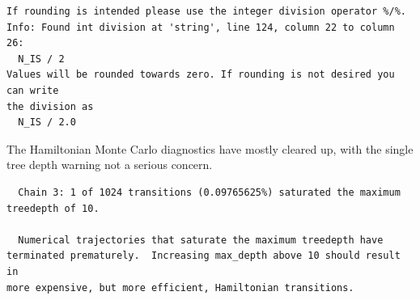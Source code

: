 \documentclass[
  letterpaper,
  DIV=11,
  numbers=noendperiod]{scrartcl}
\newenvironment{Shaded}{\begin{snugshade}}{\end{snugshade}}
\newcommand{\AttributeTok}[1]{\textcolor[rgb]{0.40,0.45,0.13}{#1}}
\newcommand{\DecValTok}[1]{\textcolor[rgb]{0.68,0.00,0.00}{#1}}
\newcommand{\FunctionTok}[1]{\textcolor[rgb]{0.28,0.35,0.67}{#1}}
\newcommand{\NormalTok}[1]{\textcolor[rgb]{0.00,0.23,0.31}{#1}}
\newcommand{\OtherTok}[1]{\textcolor[rgb]{0.00,0.23,0.31}{#1}}
\newcommand{\SpecialCharTok}[1]{\textcolor[rgb]{0.37,0.37,0.37}{#1}}
\newcommand{\StringTok}[1]{\textcolor[rgb]{0.13,0.47,0.30}{#1}}
\begin{document}
\begin{Shaded}
\end{Shaded}

\begin{verbatim}
If rounding is intended please use the integer division operator %/%.
Info: Found int division at 'string', line 124, column 22 to column 26:
  N_IS / 2
Values will be rounded towards zero. If rounding is not desired you can write
the division as
  N_IS / 2.0
\end{verbatim}

The Hamiltonian Monte Carlo diagnostics have mostly cleared up, with the
single tree depth warning not a serious concern.

\begin{Shaded}
\end{Shaded}

\begin{verbatim}
  Chain 3: 1 of 1024 transitions (0.09765625%) saturated the maximum treedepth of 10.

  Numerical trajectories that saturate the maximum treedepth have
terminated prematurely.  Increasing max_depth above 10 should result in
more expensive, but more efficient, Hamiltonian transitions.
\end{verbatim}
\end{document}
